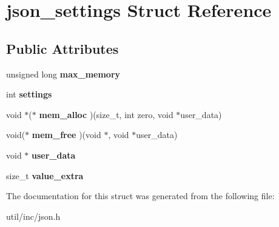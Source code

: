 \hypertarget{structjson__settings}{}\section{json\+\_\+settings Struct Reference}
\label{structjson__settings}
\subsection*{Public Attributes}
\begin{DoxyCompactItemize}
\item 
\mbox{\label{structjson__settings_a11f3f327c03708ce71b972fca16e2738}} 
unsigned long {\bfseries max\+\_\+memory}
\item 
\mbox{\label{structjson__settings_afe11eba2d405445ccc8473f4aa618aa0}} 
int {\bfseries settings}
\item 
\mbox{\label{structjson__settings_a544df3d32186f1c5a08f3fa3201144aa}} 
void $\ast$($\ast$ {\bfseries mem\+\_\+alloc} )(size\+\_\+t, int zero, void $\ast$user\+\_\+data)
\item 
\mbox{\label{structjson__settings_ae98a143b0ffa391146b536e581f85896}} 
void($\ast$ {\bfseries mem\+\_\+free} )(void $\ast$, void $\ast$user\+\_\+data)
\item 
\mbox{\label{structjson__settings_af6fb4a4393b7ab040e738009bc4e3e91}} 
void $\ast$ {\bfseries user\+\_\+data}
\item 
\mbox{\label{structjson__settings_a9994b6a482724a2ab0ee18d578c2f505}} 
size\+\_\+t {\bfseries value\+\_\+extra}
\end{DoxyCompactItemize}


The documentation for this struct was generated from the following file\+:\begin{DoxyCompactItemize}
\item 
util/inc/json.\+h\end{DoxyCompactItemize}
